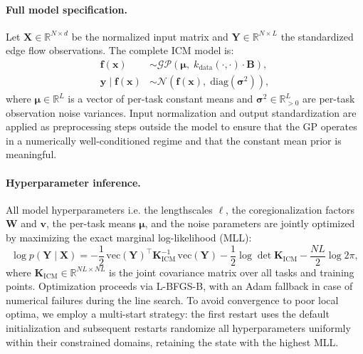 \documentclass[11pt]{article}
\begin{document}
\paragraph{Full model specification.}
Let $\mathbf{X} \in \mathbb{R}^{N \times d}$ be the normalized input matrix and
$\mathbf{Y} \in \mathbb{R}^{N \times L}$ the standardized edge flow observations.
The complete ICM model is:
%
\begin{align}
    \mathbf{f}(\mathbf{x}) &\sim \mathcal{GP}\!\left(
        \boldsymbol{\mu},\;
        k_{\mathrm{data}}(\cdot,\cdot) \cdot \mathbf{B}
    \right), \\
    \mathbf{y} \mid \mathbf{f}(\mathbf{x}) &\sim \mathcal{N}\!\left(
        \mathbf{f}(\mathbf{x}),\;
        \mathrm{diag}(\boldsymbol{\sigma}^2)
    \right),
\end{align}
%
where $\boldsymbol{\mu} \in \mathbb{R}^L$ is a vector of per-task constant means
and $\boldsymbol{\sigma}^2 \in \mathbb{R}^L_{>0}$ are per-task observation noise
variances. Input normalization and output standardization are applied as preprocessing
steps outside the model to ensure that the GP operates in a numerically
well-conditioned regime and that the constant mean prior is meaningful.

\paragraph{Hyperparameter inference.}
All model hyperparameters i.e. the lengthscales $\boldsymbol{\ell}$, the
coregionalization factors $\mathbf{W}$ and $\mathbf{v}$, the per-task means
$\boldsymbol{\mu}$, and the noise parameters are jointly optimized by maximizing
the exact marginal log-likelihood (MLL):
%
\begin{equation}
    \log p(\mathbf{Y} \mid \mathbf{X})
    = -\frac{1}{2}\,\mathrm{vec}(\mathbf{Y})^\top
      \mathbf{K}_{\mathrm{ICM}}^{-1}\,\mathrm{vec}(\mathbf{Y})
      - \frac{1}{2}\log\det \mathbf{K}_{\mathrm{ICM}}
      - \frac{NL}{2}\log 2\pi,
    \label{eq:mll}
\end{equation}
%
where $\mathbf{K}_{\mathrm{ICM}} \in \mathbb{R}^{NL \times NL}$ is the joint
covariance matrix over all tasks and training points. Optimization proceeds via
L-BFGS-B, with an Adam fallback in case of numerical failures during the line search.
To avoid convergence to poor local optima, we employ a multi-start strategy: the
first restart uses the default initialization and subsequent restarts randomize all
hyperparameters uniformly within their constrained domains, retaining the state with
the highest MLL.
\end{document}
